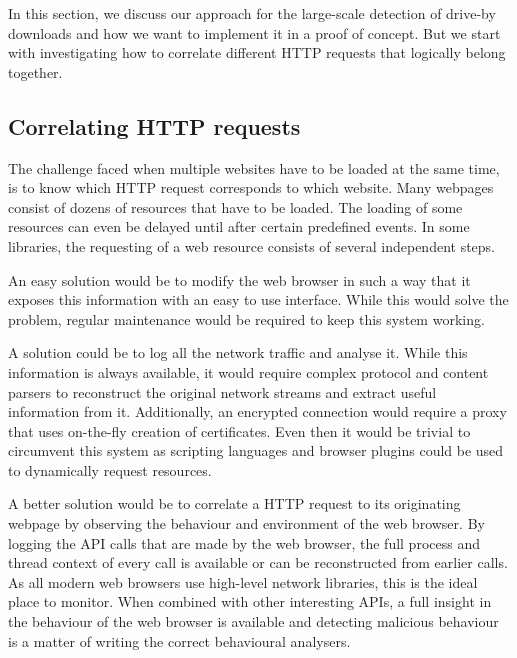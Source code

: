 In this section, we discuss our approach for the large-scale detection of drive-by downloads and how we want to implement it in a proof of concept. But we start with investigating how to correlate different HTTP requests that logically belong together.

\subsection{Correlating HTTP requests}

The challenge faced when multiple websites have to be loaded at the same time, is to know which HTTP request corresponds to which website. Many webpages consist of dozens of resources that have to be loaded. The loading of some resources can even be delayed until after certain predefined events. In some libraries, the requesting of a web resource consists of several independent steps.

An easy solution would be to modify the web browser in such a way that it exposes this information with an easy to use interface. While this would solve the problem, regular maintenance would be required to keep this system working. 

A solution could be to log all the network traffic and analyse it. While this information is always available, it would require complex protocol and content parsers to reconstruct the original network streams and extract useful information from it. Additionally, an encrypted connection would require a proxy that uses on-the-fly creation of certificates. Even then it would be trivial to circumvent this system as scripting languages and browser plugins could be used to dynamically request resources.

A better solution would be to correlate a HTTP request to its originating webpage by observing the behaviour and environment of the web browser. By logging the API calls that are made by the web browser, the full process and thread context of every call is available or can be reconstructed from earlier calls. As all modern web browsers use high-level network libraries, this is the ideal place to monitor. When combined with other interesting APIs, a full insight in the behaviour of the web browser is available and detecting malicious behaviour is a matter of writing the correct behavioural analysers.

